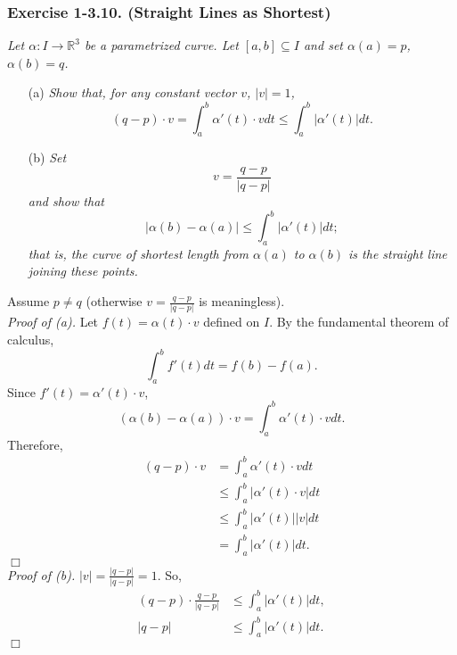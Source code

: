 \documentclass{article}
\begin{document}
\subsubsection*{Exercise 1-3.10. (Straight Lines as Shortest)}
\emph{Let $\alpha: I \to \mathbb{R}^3$ be a parametrized curve.
Let $[a,b] \subseteq I$ and set $\alpha(a) = p$, $\alpha(b) = q$.}
\begin{enumerate}
\item[(a)]
  \emph{Show that, for any constant vector $v$, $|v| = 1$,
  $$(q-p) \cdot v
  = \int_{a}^{b} \alpha'(t) \cdot v dt
  \leq \int_{a}^{b} |\alpha'(t)| dt.$$}

\item[(b)]
  \emph{Set
  $$v = \frac{q-p}{|q-p|}$$
  and show that
  $$|\alpha(b) - \alpha(a)| \leq \int_{a}^{b} |\alpha'(t)| dt;$$
  that is, the curve of shortest length from
  $\alpha(a)$ to $\alpha(b)$ is the straight line joining these points.} \\
\end{enumerate}

Assume $p \neq q$ (otherwise $v = \frac{q-p}{|q-p|}$ is meaningless). \\



\emph{Proof of (a).}
Let $f(t) = \alpha(t) \cdot v$ defined on $I$.
By the fundamental theorem of calculus,
$$\int_{a}^{b} f'(t) dt = f(b) - f(a).$$
Since $f'(t) = \alpha'(t) \cdot v$,
$$(\alpha(b) - \alpha(a)) \cdot v = \int_{a}^{b} \alpha'(t) \cdot v dt.$$
Therefore,
\begin{align*}
  (q - p) \cdot v
  &= \int_{a}^{b} \alpha'(t) \cdot v dt \\
  &\leq \int_{a}^{b} |\alpha'(t) \cdot v| dt \\
  &\leq \int_{a}^{b} |\alpha'(t)||v| dt \\
  &= \int_{a}^{b} |\alpha'(t)| dt.
\end{align*}
$\Box$ \\



\emph{Proof of (b).}
$|v| = \frac{|q-p|}{|q-p|} = 1$.
So,
\begin{align*}
  (q-p) \cdot \frac{q-p}{|q-p|}
  &\leq \int_{a}^{b} |\alpha'(t)| dt, \\
  |q-p|
  &\leq \int_{a}^{b} |\alpha'(t)| dt.
\end{align*}
$\Box$ \\\\
\end{document}
